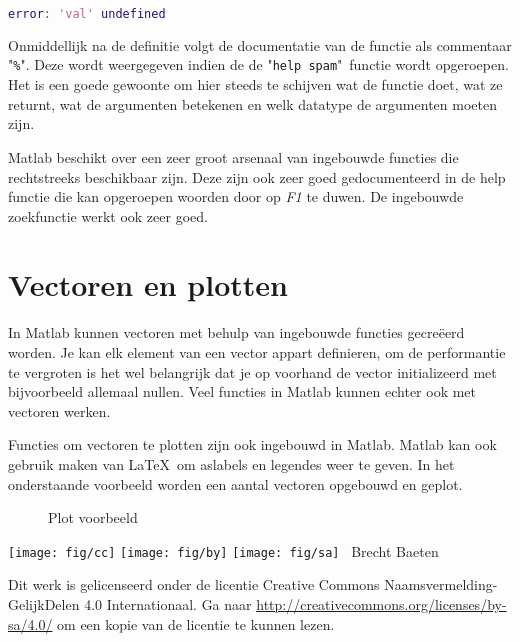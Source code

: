 \documentclass[11pt,twoside]{article}
\begin{document}
\begin{lstlisting}[language=matlab]
error: 'val' undefined
\end{lstlisting}

Onmiddellijk na de definitie volgt de documentatie van de functie als commentaar "\lstinline{%}". Deze wordt weergegeven indien de de "\lstinline{help spam}"\ functie wordt opgeroepen. Het is een goede gewoonte om hier steeds te schijven wat de functie doet, wat ze returnt, wat de argumenten betekenen en welk datatype de argumenten moeten zijn.

Matlab beschikt over een zeer groot arsenaal van ingebouwde functies die rechtstreeks beschikbaar zijn. Deze zijn ook zeer goed gedocumenteerd in de help functie die kan opgeroepen woorden door op \emph{F1} te duwen. De ingebouwde zoekfunctie werkt ook zeer goed.

	\section{Vectoren en plotten} 
In Matlab kunnen vectoren met behulp van ingebouwde functies gecreëerd worden. Je kan elk element van een vector appart definieren, om de performantie te vergroten is het wel belangrijk dat je op voorhand de vector initializeerd met bijvoorbeeld allemaal nullen. Veel functies in Matlab kunnen echter ook met vectoren werken.

Functies om vectoren te plotten zijn ook ingebouwd in Matlab. Matlab kan ook gebruik maken van \LaTeX\ om aslabels en legendes weer te geven. In het onderstaande voorbeeld worden een aantal vectoren opgebouwd en geplot.


\begin{figure}[ht]
	\centering
	\caption{Plot voorbeeld}
	\label{fig:sinus_cosinus}
\end{figure}

\vspace{2cm}

\null
\vfill
\texttt{[image: fig/cc]}
\texttt{[image: fig/by]}
\texttt{[image: fig/sa]}
\quad \the\year\ Brecht Baeten
\vspace{0.5cm}

Dit werk is gelicenseerd onder de licentie Creative Commons Naamsvermelding-GelijkDelen 4.0 Internationaal. Ga naar \url{http://creativecommons.org/licenses/by-sa/4.0/} om een kopie van de licentie te kunnen lezen.
\vspace{1cm}
\end{document}
